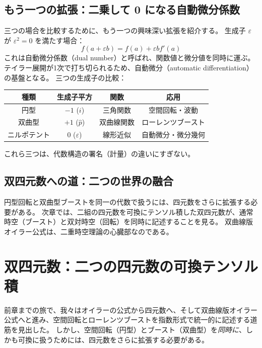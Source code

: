 \documentclass[dvipdfmx,a4paper]{jsbook}
\theoremstyle{definition}
\theoremstyle{remark}
\begin{document}
\section{もう一つの拡張：二乗して 0 になる自動微分係数}
\label{sec:dual-numbers}

三つの場合を比較するために、もう一つの興味深い拡張を紹介する。
生成子 $\varepsilon$ が $\varepsilon^2 = 0$ を満たす場合：
\begin{equation}
  f(a + \varepsilon b) = f(a) + \varepsilon b f'(a)
\end{equation}
これは自動微分係数（dual number）と呼ばれ、関数値と微分値を同時に運ぶ。
テイラー展開が1次で打ち切られるため、自動微分（automatic differentiation）の基盤となる。
三つの生成子の比較：
\begin{center}
  \begin{tabular}{c|c|c|c}
    種類 & 生成子平方 & 関数 & 応用 \\ \hline
    円型 & $-1$ ($i$) & 三角関数 & 空間回転・波動 \\
    双曲型 & $+1$ ($\hat{p}$) & 双曲線関数 & ローレンツブースト \\
    ニルポテント & $0$ ($\varepsilon$) & 線形近似 & 自動微分・微分幾何
  \end{tabular}
\end{center}
これら三つは、代数構造の署名（計量）の違いにすぎない。

\section{双四元数への道：二つの世界の融合}
\label{sec:to-biquaternion}

円型回転と双曲型ブーストを同一の代数で扱うには、四元数をさらに拡張する必要がある。
次章では、二組の四元数を可換にテンソル積した双四元数が、通常時空（ブースト）と双対時空（回転）を同時に記述することを見る。
双曲線版オイラー公式は、二重時空理論の心臓部なのである。

\chapter{双四元数：二つの四元数の可換テンソル積}
\label{chap:biquaternion}

前章までの旅で、我々はオイラーの公式から四元数へ、そして双曲線版オイラー公式へと進み、空間回転とローレンツブーストを指数形式で統一的に記述する道筋を見出した。
しかし、空間回転（円型）とブースト（双曲型）を\emph{同時に}、しかも可換に扱うためには、四元数をさらに拡張する必要がある。
\end{document}
